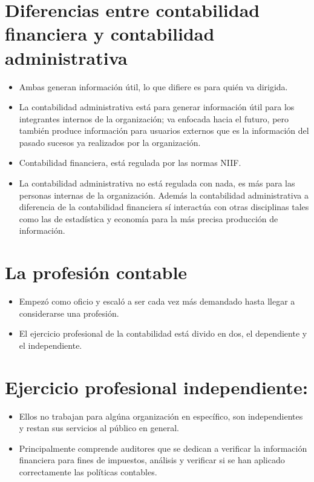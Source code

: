 \documentclass{article}
\begin{document}
\section{Diferencias entre contabilidad financiera y contabilidad administrativa}
\begin{itemize}
    \item Ambas generan información útil, lo que difiere es para quién va dirigida.
    \item La contabilidad administrativa está para generar información útil para los integrantes internos de la organización; va enfocada hacia el futuro, pero también produce información para usuarios externos que es la información del pasado sucesos ya realizados por la organización.
    \item Contabilidad financiera, está regulada por las normas NIIF.
    \item La contabilidad administrativa no está regulada con nada, es más para las personas internas de la organización. Además la contabilidad administrativa a diferencia de la contabilidad financiera sí interactúa con otras disciplinas tales como las de estadística y economía para la más precisa producción de información.
\end{itemize}

\section{La profesión contable}
\begin{itemize}
    \item Empezó como oficio y escaló a ser cada vez más demandado hasta llegar a considerarse una profesión.
    \item El ejercicio profesional de la contabilidad está divido en dos, el dependiente y el independiente.
\end{itemize}

\section{Ejercicio profesional independiente:}
\begin{itemize}
    \item Ellos no trabajan para algúna organización en específico, son independientes y restan sus servicios al público en general.
    \item Principalmente comprende auditores que se dedican a verificar la información financiera para fines de impuestos, análisis y verificar si se han aplicado correctamente las políticas contables.
\end{itemize}
\end{document}

